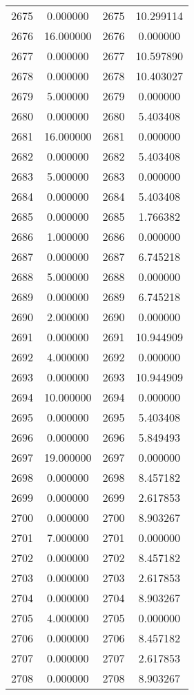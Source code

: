 \documentclass[12pt]{article}
\begin{document}
\begin{longtable}{@{}cccc@{}}
2675 & 0.000000 & 2675 & 10.299114 \\
2676 & 16.000000 & 2676 & 0.000000 \\
2677 & 0.000000 & 2677 & 10.597890 \\
2678 & 0.000000 & 2678 & 10.403027 \\
2679 & 5.000000 & 2679 & 0.000000 \\
2680 & 0.000000 & 2680 & 5.403408 \\
2681 & 16.000000 & 2681 & 0.000000 \\
2682 & 0.000000 & 2682 & 5.403408 \\
2683 & 5.000000 & 2683 & 0.000000 \\
2684 & 0.000000 & 2684 & 5.403408 \\
2685 & 0.000000 & 2685 & 1.766382 \\
2686 & 1.000000 & 2686 & 0.000000 \\
2687 & 0.000000 & 2687 & 6.745218 \\
2688 & 5.000000 & 2688 & 0.000000 \\
2689 & 0.000000 & 2689 & 6.745218 \\
2690 & 2.000000 & 2690 & 0.000000 \\
2691 & 0.000000 & 2691 & 10.944909 \\
2692 & 4.000000 & 2692 & 0.000000 \\
2693 & 0.000000 & 2693 & 10.944909 \\
2694 & 10.000000 & 2694 & 0.000000 \\
2695 & 0.000000 & 2695 & 5.403408 \\
2696 & 0.000000 & 2696 & 5.849493 \\
2697 & 19.000000 & 2697 & 0.000000 \\
2698 & 0.000000 & 2698 & 8.457182 \\
2699 & 0.000000 & 2699 & 2.617853 \\
2700 & 0.000000 & 2700 & 8.903267 \\
2701 & 7.000000 & 2701 & 0.000000 \\
2702 & 0.000000 & 2702 & 8.457182 \\
2703 & 0.000000 & 2703 & 2.617853 \\
2704 & 0.000000 & 2704 & 8.903267 \\
2705 & 4.000000 & 2705 & 0.000000 \\
2706 & 0.000000 & 2706 & 8.457182 \\
2707 & 0.000000 & 2707 & 2.617853 \\
2708 & 0.000000 & 2708 & 8.903267 \\

\end{longtable}
\end{document}
